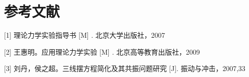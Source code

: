 
\section{参考文献}

[1] 理论力学实验指导书 [M] . 北京大学出版社，2007 

[2] 王惠明。应用理论力学实验 [M] . 北京高等教育出版社，2009

[3] 刘丹，侯之超。三线摆方程简化及其共振问题研究 [J]. 振动与冲击，2007,33
